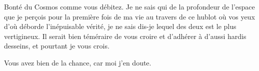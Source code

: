 \begin{drama}
  \elaspeaks Bonté du Cosmos comme vous débitez. Je ne sais qui de la profondeur de l’espace que je perçois pour la première fois de ma vie au travers de ce hublot où vos yeux d’où déborde l’inépuisable vérité, je ne sais dis-je lequel des deux est le plus vertigineux. Il serait bien téméraire de vous croire et d’adhérer à d’aussi hardis desseins, et pourtant je vous crois.


  \elenaspeaks Vous avez bien de la chance, car moi j’en doute.
\end{drama}

\scene

\StageDirII{\elena, \alexas, \general}



